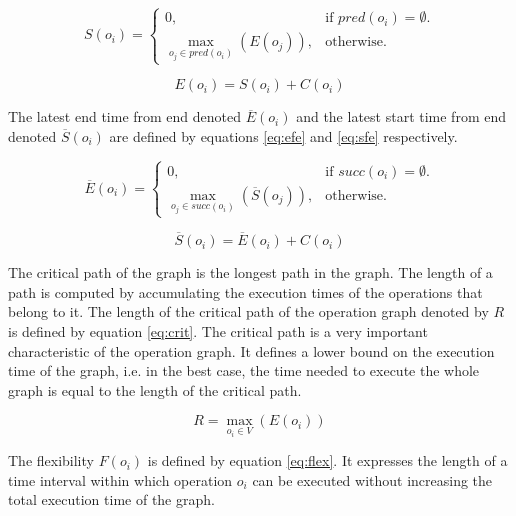\begin{equation}
S(o_i)=\begin{cases}
    0, & \text{if $pred(o_i)=\emptyset$}.\\
    \max_{o_j \in pred(o_i)}(E(o_j)), & \text{otherwise}.
  \end{cases}
	\label{eq:sfs}
\end{equation}

\begin{equation}
	E(o_i)=S(o_i)+C(o_i) 
	\label{eq:efs}
\end{equation}

The latest end time from end denoted $\overline{E}(o_i)$ and the latest start time from end denoted $\overline{S}(o_i)$ are defined by equations \ref{eq:efe} and \ref{eq:sfe} respectively. %

\begin{equation}
\overline{E}(o_i)=\begin{cases}
    0, & \text{if $succ(o_i)=\emptyset$}.\\
    \max_{o_j \in succ(o_i)}(\overline{S}(o_j)), & \text{otherwise}.
  \end{cases}
	\label{eq:efe}
\end{equation}

\begin{equation}
	\overline{S}(o_i)=\overline{E}(o_i)+C(o_i) 
	\label{eq:sfe}
\end{equation}

The critical path of the graph is the longest path in the graph. The length of a path is computed by accumulating the execution times of the operations that belong to it. The length of the critical path of the operation graph denoted by $R$ is defined by equation \ref{eq:crit}. The critical path is a very important characteristic of the operation graph. It defines a lower bound on the execution time of the graph, i.e. in the best case, the time needed to execute the whole graph is equal to the length of the critical path. 

\begin{equation}
	R = \max_{o_i \in V}(E(o_i)) 
	\label{eq:crit}
\end{equation}
 
The flexibility $F(o_i)$ is defined by equation \ref{eq:flex}. It expresses the length of a time interval within which operation $o_i$ can be executed without increasing the total execution time of the graph.

